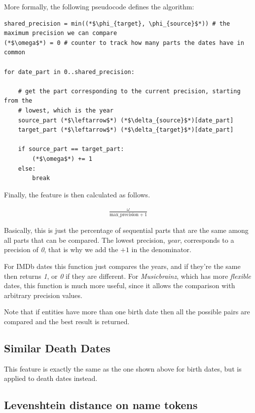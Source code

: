 \documentclass[epsfig,a4paper,11pt,titlepage,twoside,openany]{book}
\begin{document}
More formally, the following pseudocode defines the algorithm:

\begin{lstlisting}
shared_precision = min((*$\phi_{target}, \phi_{source}$*)) # the maximum precision we can compare
(*$\omega$*) = 0 # counter to track how many parts the dates have in common

for date_part in 0..shared_precision:

    # get the part corresponding to the current precision, starting from the 
    # lowest, which is the year
    source_part (*$\leftarrow$*) (*$\delta_{source}$*)[date_part]
    target_part (*$\leftarrow$*) (*$\delta_{target}$*)[date_part]
    
    if source_part == target_part:
        (*$\omega$*) += 1
    else:
        break
\end{lstlisting}

Finally, the feature is then calculated as follows.

\begin{align*} 
\frac{\omega}{\text{max\_precision} + 1}
\end{align*}

Basically, this is just the percentage of sequential parts that are the same among all parts that can be compared. The lowest precision, \textit{year}, corresponds to a precision of \textit{0}, that is why we add the $+1$ in the denominator.

For IMDb dates this function just compares the years, and if they're the same then returns \textit{1}, or \textit{0} if they are different. For \textit{Musicbrainz}, which has more \textit{flexible} dates, this function is much more useful, since it allows the comparison with arbitrary precision values.
 
Note that if entities have more than one birth date then all the possible pairs are compared and the best result is returned.  
 
\subsection{Similar Death Dates}
\label{sec:feature-similar-death-dates}
 
This feature is exactly the same as the one shown above for birth dates, but is applied to death dates instead.

\subsection{Levenshtein distance on name tokens}
\label{sec:feature-levenshtein-on-name-tokens}
\end{document}
